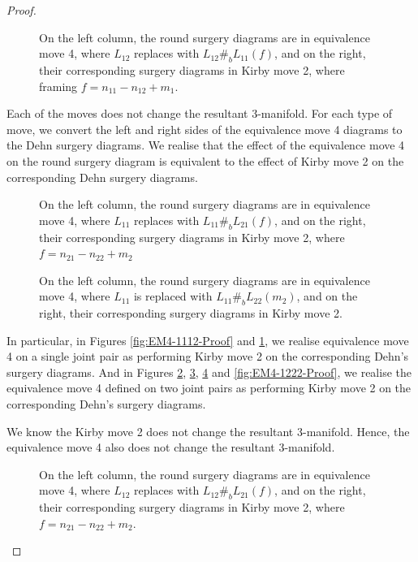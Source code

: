 \documentclass[10pt,a4paper]{amsart}
\begin{document}
\begin{proof}
\begin{figure}[ht]
    \centering
    
    \caption{On the left column, the round surgery diagrams are in equivalence move 4, where $L_{12}$ replaces with $L_{12}\#_b L_{11}(f)$, and on the right, their corresponding surgery diagrams in Kirby move 2, where framing $f= n_{11}-n_{12}+m_1$.}
    \label{fig:EM4-1211-Proof}
\end{figure}
Each of the moves does not change the resultant 3-manifold. 
For each type of move, we convert the left and right sides of the equivalence move 4 diagrams to the Dehn surgery diagrams. 
We realise that the effect of the equivalence move 4 on the round surgery diagram is equivalent to the effect of Kirby move 2 on the corresponding Dehn surgery diagrams. 
\begin{figure}[ht]
    \centering
    
    \caption{On the left column, the round surgery diagrams are in equivalence move 4, where $L_{11}$ replaces with $L_{11}\#_b L_{21}(f)$, and on the right, their corresponding surgery diagrams in Kirby move 2, where $f= n_{21}-n_{22}+m_2$}
    \label{fig:EM4-1121-Proof}
\end{figure}

\begin{figure}[ht]
    \centering
    
    \caption{On the left column, the round surgery diagrams are in equivalence move 4, where $L_{11}$ is replaced with $L_{11}\#_b L_{22}(m_2)$, and on the right, their corresponding surgery diagrams in Kirby move 2.}
    \label{fig:EM4-1122-Proof}
\end{figure}

In particular, in Figures \ref{fig:EM4-1112-Proof} and \ref{fig:EM4-1211-Proof}, we realise equivalence move 4 on a single joint pair as performing Kirby move 2 on the corresponding Dehn's surgery diagrams.
And in Figures \ref{fig:EM4-1121-Proof}, \ref{fig:EM4-1122-Proof}, \ref{fig:EM4-1221-Proof} and \ref{fig:EM4-1222-Proof}, we realise the equivalence move 4 defined on two joint pairs as performing Kirby move 2 on the corresponding Dehn's surgery diagrams. 

We know the Kirby move 2 does not change the resultant 3-manifold. Hence, the equivalence move 4 also does not change the resultant 3-manifold. 

\begin{figure}[ht]
    \centering
    
    \caption{On the left column, the round surgery diagrams are in equivalence move 4, where $L_{12}$ replaces with $L_{12}\#_b L_{21}(f)$, and on the right, their corresponding surgery diagrams in Kirby move 2, where $f=n_{21}-n_{22}+m_2$.}
    \label{fig:EM4-1221-Proof}
\end{figure}


\end{proof}
\end{document}
